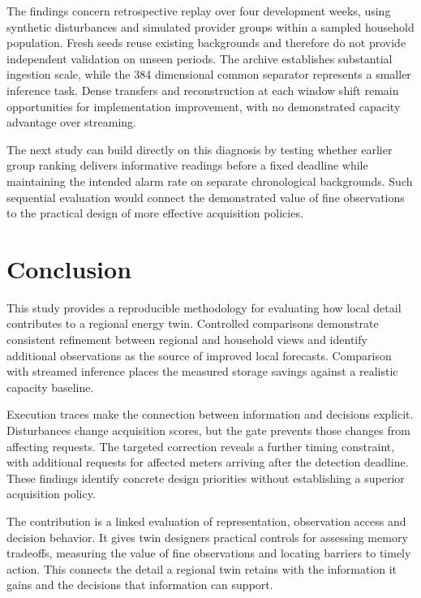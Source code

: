 \documentclass[conference]{IEEEtran}
\begin{document}
The findings concern retrospective replay over four development weeks, using synthetic disturbances and simulated provider groups within a sampled household population. Fresh seeds reuse existing backgrounds and therefore do not provide independent validation on unseen periods. The archive establishes substantial ingestion scale, while the 384 dimensional common separator represents a smaller inference task. Dense transfers and reconstruction at each window shift remain opportunities for implementation improvement, with no demonstrated capacity advantage over streaming.

The next study can build directly on this diagnosis by testing whether earlier group ranking delivers informative readings before a fixed deadline while maintaining the intended alarm rate on separate chronological backgrounds. Such sequential evaluation would connect the demonstrated value of fine observations to the practical design of more effective acquisition policies.


\section{Conclusion}
This study provides a reproducible methodology for evaluating how local detail contributes to a regional energy twin. Controlled comparisons demonstrate consistent refinement between regional and household views and identify additional observations as the source of improved local forecasts. Comparison with streamed inference places the measured storage savings against a realistic capacity baseline.

Execution traces make the connection between information and decisions explicit. Disturbances change acquisition scores, but the gate prevents those changes from affecting requests. The targeted correction reveals a further timing constraint, with additional requests for affected meters arriving after the detection deadline. These findings identify concrete design priorities without establishing a superior acquisition policy.

The contribution is a linked evaluation of representation, observation access and decision behavior. It gives twin designers practical controls for assessing memory tradeoffs, measuring the value of fine observations and locating barriers to timely action. This connects the detail a regional twin retains with the information it gains and the decisions that information can support.







\end{document}
